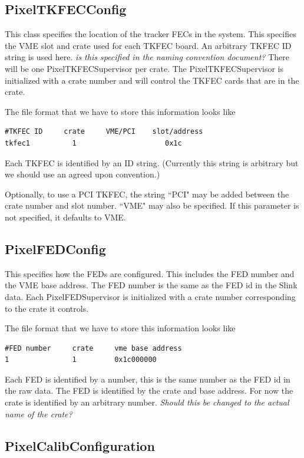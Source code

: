 \subsection{PixelTKFECConfig}

This class specifies the location of the tracker FECs in
the system. This
specifies the VME slot and crate used for each TKFEC board. An arbitrary TKFEC
ID string is used here. {\it is this specified in the naming
convention document?}
There will be one PixelTKFECSupervisor per crate. 
The PixelTKFECSupervisor is initialized
with a crate number and will control the TKFEC cards that are 
in the crate.

The file format that we have to store this information looks like
\begin{verbatim}
#TKFEC ID     crate     VME/PCI    slot/address
tkfec1          1                     0x1c
\end{verbatim}
Each TKFEC is identified by an ID string. (Currently this string
is arbitrary but we should use an agreed upon convention.)

Optionally, to use a PCI TKFEC, the string ``PCI" may be added between
the crate number and slot number.  ``VME" may also be specified.  If this
parameter is not specified, it defaults to VME.


\subsection{PixelFEDConfig}

This specifies how the FEDs are configured. This includes the FED
number and the VME base address. The FED number is the same as
the FED id in the Slink data. Each PixelFEDSupervisor is initialized
with a crate number corresponding to the crate it controls.

The file format that we have to store this information looks like
\begin{verbatim}
#FED number     crate     vme base address
1               1         0x1c000000
\end{verbatim}
Each FED is identified by a number, this is the same number as 
the FED id in the raw data. The FED is identified by the 
crate and base address. For now the crate is identified by an
arbitrary number. {\it Should this be changed to the 
actual name of the crate?}




\subsection{PixelCalibConfiguration}


